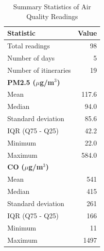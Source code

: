 \begin{table}[htbp]
\centering
\caption{Summary Statistics of Air Quality Readings}
\label{tab:summary}
\begin{tabular}{lr}
\toprule
Statistic & Value \\
\midrule
Total readings & 98 \\
Number of days & 5 \\
Number of itineraries & 19 \\
\midrule
\multicolumn{2}{l}{\textbf{PM2.5 ($\mu$g/m$^3$)}} \\
\quad Mean & 117.6 \\
\quad Median & 94.0 \\
\quad Standard deviation & 85.6 \\
\quad IQR (Q75 - Q25) & 42.2 \\
\quad Minimum & 22.0 \\
\quad Maximum & 584.0 \\
\midrule
\multicolumn{2}{l}{\textbf{CO ($\mu$g/m$^3$)}} \\
\quad Mean & 541 \\
\quad Median & 415 \\
\quad Standard deviation & 261 \\
\quad IQR (Q75 - Q25) & 166 \\
\quad Minimum & 11 \\
\quad Maximum & 1497 \\
\bottomrule
\end{tabular}
\end{table}

